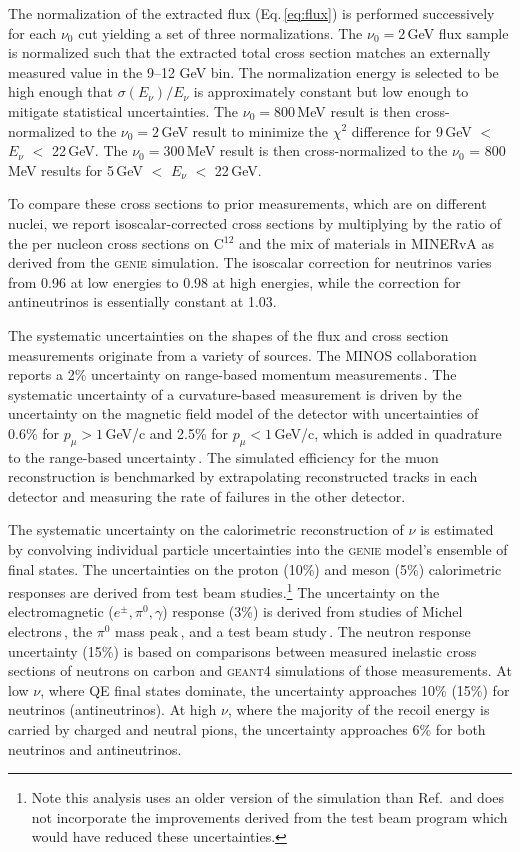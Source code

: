 \documentclass[%
reprint,
% 
superscriptaddress,
showpacs,
preprintnumbers,
showkeys,
nofootinbib,
 amsmath,amssymb,
 aps,
 prd,
floatfix,
]{revtex4-1}
\newcommand\minerva  {MINERvA\xspace}
\newcommand\GENIE  {\textsc{genie}\xspace}
\newcommand\GEANT  {\textsc{geant4}\xspace}
\begin{document}
The normalization of the extracted flux (Eq.\,\ref{eq:flux}) is performed successively for each $\nu_0$ cut yielding a set of three normalizations. The $\nu_0=2$\,GeV flux sample is normalized such that the extracted total cross section matches an externally measured value in the 9--12 GeV bin. The normalization energy is selected to be high enough that $\sigma(E_\nu)/E_\nu$ is approximately constant but low enough to mitigate statistical uncertainties. The $\nu_0 = 800$\,MeV result is then cross-normalized to the $\nu_0 = 2$\,GeV result to minimize the $\chi^2$ difference for 9\,GeV $<$ $E_\nu$ $<$ 22\,GeV. The $\nu_0 = 300$\,MeV result is then cross-normalized to the $\nu_0$ = 800\,MeV results for 5\,GeV $<$ $E_\nu$ $<$ 22\,GeV. 

To compare these cross sections to prior measurements, which are on different nuclei, we report isoscalar-corrected cross sections by multiplying by the ratio of the per nucleon cross sections on C$^{12}$ and the mix of materials in \minerva as derived from the \GENIE simulation. The isoscalar correction for neutrinos varies from 0.96 at low energies to 0.98 at high energies, while the correction for antineutrinos is essentially constant at 1.03. 

The systematic uncertainties on the shapes of the flux and cross section measurements originate from a variety of sources. The MINOS collaboration reports a 2\% uncertainty on range-based momentum measurements\,\cite{MINOS-NIM}. The systematic uncertainty of a curvature-based measurement is driven by the uncertainty on the magnetic field model of the detector with uncertainties of 0.6\% for $p_\mu>1$\,GeV/c and 2.5\% for $p_\mu<1$\,GeV/c, which is added in quadrature to the range-based uncertainty\,\cite{MINERvA-NIM}. The simulated efficiency for the muon reconstruction is benchmarked by extrapolating reconstructed tracks in each detector and measuring the rate of failures in the other detector. 

The systematic uncertainty on the calorimetric reconstruction of $\nu$ is estimated by convolving individual particle uncertainties into the \GENIE model's ensemble of final states. The uncertainties on the proton (10\%) and meson (5\%) calorimetric responses are derived from test beam studies.\footnote{Note this analysis uses an older version of the simulation than Ref.\,\cite{TB-NIM} and does not incorporate the improvements derived from the test beam program which would have reduced these uncertainties.} The uncertainty on the electromagnetic ($e^{\pm}, \pi^0, \gamma$) response (3\%) is derived from studies of Michel electrons\,\cite{MINERvA-NIM}, the $\pi^0$ mass peak\,\cite{MINERvA-pi0}, and a test beam study\,\cite{TB-NIM}. The neutron response uncertainty (15\%) is based on comparisons between measured inelastic cross sections of neutrons on carbon and \GEANT simulations of those measurements. At low $\nu$, where QE final states dominate, the uncertainty approaches 10\% (15\%) for neutrinos (antineutrinos). At high $\nu$, where the majority of the recoil energy is carried by charged and neutral pions, the uncertainty approaches 6\% for both neutrinos and antineutrinos. 
\end{document}
